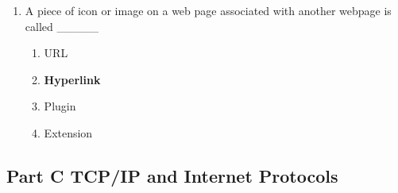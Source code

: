 \documentclass{article}
\begin{document}
\begin{enumerate}[label=\arabic*.]
    \item A piece of icon or image on a web page associated with another webpage is called \_\_\_\_\_
    \begin{enumerate}
        \item URL
        \item \textbf{Hyperlink}
        \item Plugin
        \item Extension
    \end{enumerate}

\end{enumerate}

\subsection*{Part C\: TCP/IP and Internet Protocols}
\end{document}
